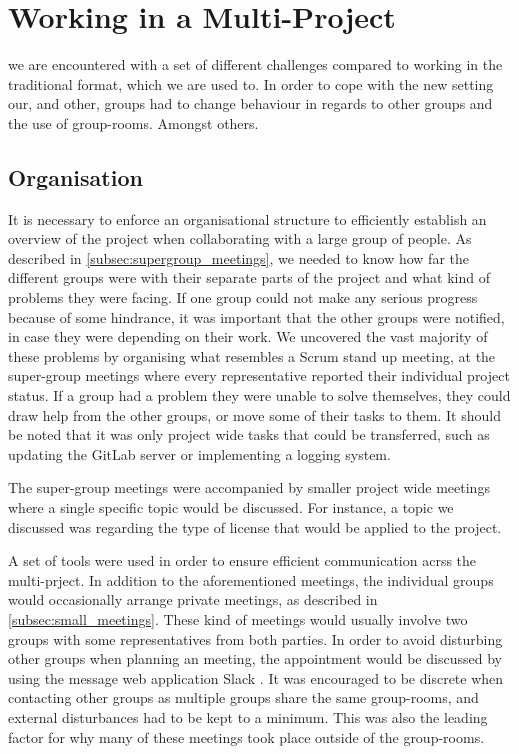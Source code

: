 \section{Working in a Multi-Project}
we are encountered with a set of different challenges compared to working in the traditional format, which we are used to. In order to cope with the new setting our, and other, groups had to change behaviour in regards to other groups and the use of group-rooms. Amongst others.

\subsection{Organisation}
It is necessary to enforce an organisational structure to efficiently establish an overview of the project when collaborating with a large group of people. As described in \cref{subsec:supergroup_meetings}, we needed to know how far the different groups were with their separate parts of the project and what kind of problems they were facing. If one group could not make any serious progress because of some hindrance, it was important that the other groups were notified, in case they were depending on their work. We uncovered the vast majority of these problems by organising what resembles a Scrum stand up meeting, at the super-group meetings where every representative reported their individual project status. If a group had a problem they were unable to solve themselves, they could draw help from the other groups, or move some of their tasks to them. It should be noted that it was only project wide tasks that could be transferred, such as updating the GitLab server or implementing a logging system.

The super-group meetings were accompanied by smaller project wide meetings where a single specific topic would be discussed. For instance, a topic we discussed was regarding the type of license that would be applied to the project.

A set of tools were used in order to ensure efficient communication acrss the multi-prject. In addition to the aforementioned meetings, the individual groups would occasionally arrange private meetings, as described in \cref{subsec:small_meetings}. These kind of meetings would usually involve two groups with some representatives from both parties. In order to avoid disturbing other groups when planning an meeting, the appointment would be discussed by using the message web application Slack \cite{slack}. It was encouraged to be discrete when contacting other groups as multiple groups share the same group-rooms, and external disturbances had to be kept to a minimum. This was also the leading factor for why many of these meetings took place outside of the group-rooms.


